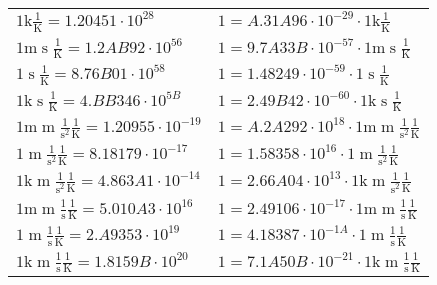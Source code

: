 \begin{center}
\begin{longtable}{l l}
{\color{gray}$1 \bm{\mathrm{ k}}{}{}{}\frac1{\operatorname{K}} = 1.20451\cdot10^{28} $}   & {\color{gray}$ 1 = A.31A96\cdot10^{-29} \cdot 1 \bm{\mathrm{ k}}{}{}{}\frac1{\operatorname{K}}$}  \\
{\color{gray}$1 \bm{\mathrm{ m}}{}{\operatorname{s}}{}\frac1{\operatorname{K}} = 1.2AB92\cdot10^{56} $}   & {\color{gray}$ 1 = 9.7A33B\cdot10^{-57} \cdot 1 \bm{\mathrm{ m}}{}{\operatorname{s}}{}\frac1{\operatorname{K}}$}  \\
{\color{black}$1 \bm{\mathrm{ }}{}{\operatorname{s}}{}\frac1{\operatorname{K}} = 8.76B01\cdot10^{58} $}   & {\color{black}$ 1 = 1.48249\cdot10^{-59} \cdot 1 \bm{\mathrm{ }}{}{\operatorname{s}}{}\frac1{\operatorname{K}}$}  \\
{\color{gray}$1 \bm{\mathrm{ k}}{}{\operatorname{s}}{}\frac1{\operatorname{K}} = 4.BB346\cdot10^{5B} $}   & {\color{gray}$ 1 = 2.49B42\cdot10^{-60} \cdot 1 \bm{\mathrm{ k}}{}{\operatorname{s}}{}\frac1{\operatorname{K}}$}  \\
{\color{gray}$1 \bm{\mathrm{ m}}{\operatorname{m}}\frac1{\operatorname{s}^2}{}\frac1{\operatorname{K}} = 1.20955\cdot10^{-19} $}   & {\color{gray}$ 1 = A.2A292\cdot10^{18} \cdot 1 \bm{\mathrm{ m}}{\operatorname{m}}\frac1{\operatorname{s}^2}{}\frac1{\operatorname{K}}$}  \\
{\color{black}$1 \bm{\mathrm{ }}{\operatorname{m}}\frac1{\operatorname{s}^2}{}\frac1{\operatorname{K}} = 8.18179\cdot10^{-17} $}   & {\color{black}$ 1 = 1.58358\cdot10^{16} \cdot 1 \bm{\mathrm{ }}{\operatorname{m}}\frac1{\operatorname{s}^2}{}\frac1{\operatorname{K}}$}  \\
{\color{gray}$1 \bm{\mathrm{ k}}{\operatorname{m}}\frac1{\operatorname{s}^2}{}\frac1{\operatorname{K}} = 4.863A1\cdot10^{-14} $}   & {\color{gray}$ 1 = 2.66A04\cdot10^{13} \cdot 1 \bm{\mathrm{ k}}{\operatorname{m}}\frac1{\operatorname{s}^2}{}\frac1{\operatorname{K}}$}  \\
{\color{gray}$1 \bm{\mathrm{ m}}{\operatorname{m}}\frac1{\operatorname{s}}{}\frac1{\operatorname{K}} = 5.010A3\cdot10^{16} $}   & {\color{gray}$ 1 = 2.49106\cdot10^{-17} \cdot 1 \bm{\mathrm{ m}}{\operatorname{m}}\frac1{\operatorname{s}}{}\frac1{\operatorname{K}}$}  \\
{\color{black}$1 \bm{\mathrm{ }}{\operatorname{m}}\frac1{\operatorname{s}}{}\frac1{\operatorname{K}} = 2.A9353\cdot10^{19} $}   & {\color{black}$ 1 = 4.18387\cdot10^{-1A} \cdot 1 \bm{\mathrm{ }}{\operatorname{m}}\frac1{\operatorname{s}}{}\frac1{\operatorname{K}}$}  \\
{\color{gray}$1 \bm{\mathrm{ k}}{\operatorname{m}}\frac1{\operatorname{s}}{}\frac1{\operatorname{K}} = 1.8159B\cdot10^{20} $}   & {\color{gray}$ 1 = 7.1A50B\cdot10^{-21} \cdot 1 \bm{\mathrm{ k}}{\operatorname{m}}\frac1{\operatorname{s}}{}\frac1{\operatorname{K}}$}  \\

\end{longtable}
\end{center}
